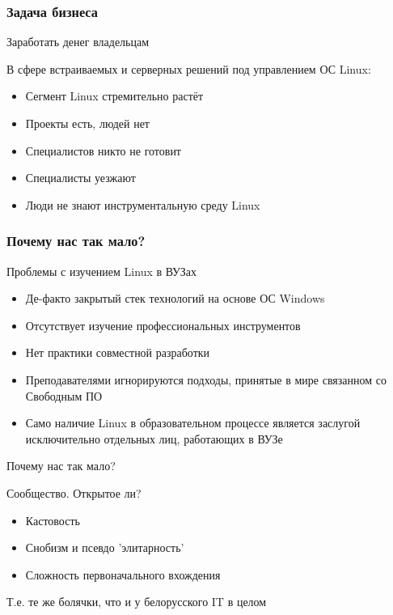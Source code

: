 \begin{frame}
	\frametitle{Задача бизнеса}

	\begin{block}{Заработать денег владельцам}

	В сфере встраиваемых и серверных решений под управлением ОС Linux:

	\begin{itemize}
	  \item Сегмент Linux стремительно растёт
	  \item Проекты есть, людей нет
	  \item Специалистов никто не готовит 
	  \item Специалисты уезжают
	  \item Люди не знают инструментальную среду Linux
	\end{itemize} 

      \end{block}
\end{frame}



\begin{frame}
	\frametitle{Почему нас так мало?}

	\begin{block}{Проблемы с изучением Linux в ВУЗах}
		\begin{itemize}
			\item Де-факто закрытый стек технологий на основе ОС Windows
			\item Отсутствует изучение профессиональных инструментов
			\item Нет практики совместной разработки
			\item Преподавателями игнорируются подходы, принятые в мире связанном со Свободным ПО
			\item Само наличие Linux в образовательном процессе является 
				заслугой исключительно отдельных лиц, работающих в ВУЗе
		\end{itemize}
	\end{block}
\end{frame}
  

\begin{frame}{Почему нас так мало?}
  \begin{block}{Сообщество. Открытое ли?}
    \begin{itemize}
      \item Кастовость
      \item Снобизм и псевдо 'элитарность'
      \item Сложность первоначального вхождения
    \end{itemize} 
  \end{block} \pause

  \alert{Т.е. те же болячки, что и у белорусского IT в целом}
\end{frame}


